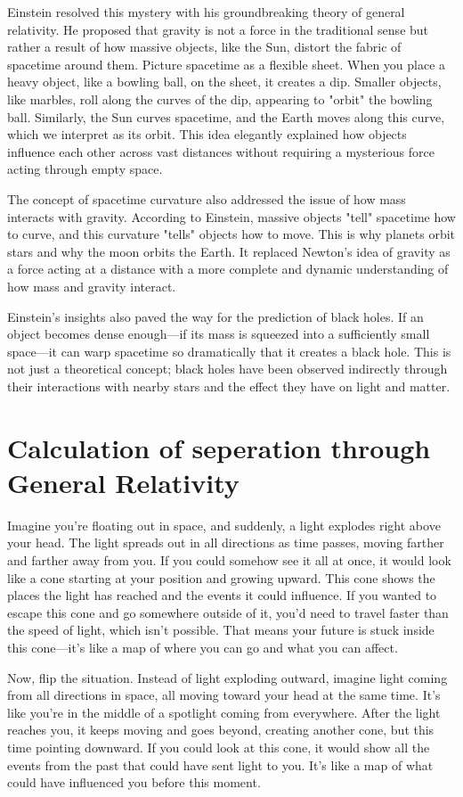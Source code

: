 \documentclass[12pt,a4paper]{article}
\begin{document}
Einstein resolved this mystery with his groundbreaking theory of general relativity. He proposed that gravity is not a force in the traditional sense but rather a result of how massive objects, like the Sun, distort the fabric of spacetime around them. Picture spacetime as a flexible sheet. When you place a heavy object, like a bowling ball, on the sheet, it creates a dip. Smaller objects, like marbles, roll along the curves of the dip, appearing to "orbit" the bowling ball. Similarly, the Sun curves spacetime, and the Earth moves along this curve, which we interpret as its orbit. This idea elegantly explained how objects influence each other across vast distances without requiring a mysterious force acting through empty space.

The concept of spacetime curvature also addressed the issue of how mass interacts with gravity. According to Einstein, massive objects "tell" spacetime how to curve, and this curvature "tells" objects how to move. This is why planets orbit stars and why the moon orbits the Earth. It replaced Newton's idea of gravity as a force acting at a distance with a more complete and dynamic understanding of how mass and gravity interact.

Einstein's insights also paved the way for the prediction of black holes. If an object becomes dense enough—if its mass is squeezed into a sufficiently small space—it can warp spacetime so dramatically that it creates a black hole. This is not just a theoretical concept; black holes have been observed indirectly through their interactions with nearby stars and the effect they have on light and matter.

\section{Calculation of seperation through General Relativity}
Imagine you’re floating out in space, and suddenly, a light explodes right above your head. The light spreads out in all directions as time passes, moving farther and farther away from you. If you could somehow see it all at once, it would look like a cone starting at your position and growing upward. This cone shows the places the light has reached and the events it could influence. If you wanted to escape this cone and go somewhere outside of it, you’d need to travel faster than the speed of light, which isn’t possible. That means your future is stuck inside this cone—it’s like a map of where you can go and what you can affect.

Now, flip the situation. Instead of light exploding outward, imagine light coming from all directions in space, all moving toward your head at the same time. It’s like you’re in the middle of a spotlight coming from everywhere. After the light reaches you, it keeps moving and goes beyond, creating another cone, but this time pointing downward. If you could look at this cone, it would show all the events from the past that could have sent light to you. It’s like a map of what could have influenced you before this moment.
\end{document}
